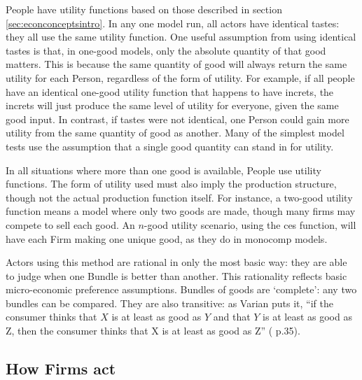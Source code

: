 People have utility functions based on those described in section \ref{sec:econconceptsintro}. In any one model run, all actors have identical tastes: they all use the same utility function. One useful assumption from using identical tastes is that, in one-good models, only the absolute quantity of that good matters. This is because the same quantity of good will always return the same utility for each Person, regardless of the form of utility. For example, if all people have an identical one-good utility function that happens to have \gls{increts}, the \gls{increts} will just produce the same level of utility for everyone, given the same good input. In contrast, if tastes were not identical, one Person could gain more utility from the same quantity of good as another. Many of the simplest model tests use the assumption that a single good quantity can stand in for utility.

In all situations where more than one good is available, People use utility functions. The form of utility used must also imply the production structure, though not the actual production function itself. For instance, a two-good utility function means a model where only two goods are made, though many firms may compete to sell each good. An $n$-good utility scenario, using the \gls{ces} function, will have each Firm making one unique good, as they do in \gls{monocomp} models.

Actors using this method are rational in only the most basic way: they are able to judge when one Bundle is better than another. This rationality reflects basic micro-economic preference assumptions. Bundles of goods are `complete': any two bundles can be compared. They are also transitive: as Varian puts it, ``if the consumer thinks that $X$ is at least as good as $Y$ and that $Y$ is at least as good as Z, then the consumer thinks that X is at least as good as Z'' (\citealt{varian_intermediate_2006} p.35). 





\subsection{How Firms act \label{sec:howFirmsAct}}

